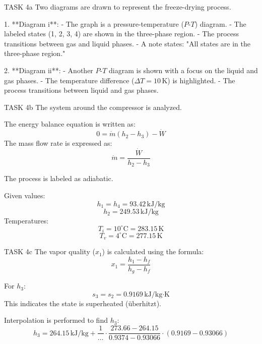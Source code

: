 TASK 4a  
Two diagrams are drawn to represent the freeze-drying process.  

1. **Diagram i**:  
   - The graph is a pressure-temperature (\(P\)-\(T\)) diagram.  
   - The labeled states (1, 2, 3, 4) are shown in the three-phase region.  
   - The process transitions between gas and liquid phases.  
   - A note states: "All states are in the three-phase region."  

2. **Diagram ii**:  
   - Another \(P\)-\(T\) diagram is shown with a focus on the liquid and gas phases.  
   - The temperature difference (\(\Delta T = 10 \, \text{K}\)) is highlighted.  
   - The process transitions between liquid and gas phases.  

TASK 4b  
The system around the compressor is analyzed.  

The energy balance equation is written as:  
\[
0 = \dot{m} (h_2 - h_3) - \dot{W}
\]  
The mass flow rate is expressed as:  
\[
\dot{m} = \frac{\dot{W}}{h_2 - h_3}
\]  

The process is labeled as adiabatic.  

Given values:  
\[
h_1 = h_4 = 93.42 \, \text{kJ/kg}
\]  
\[
h_2 = 249.53 \, \text{kJ/kg}
\]  
Temperatures:  
\[
T_i = 10^\circ\text{C} = 283.15 \, \text{K}
\]  
\[
T_v = 4^\circ\text{C} = 277.15 \, \text{K}
\]  

TASK 4c  
The vapor quality (\(x_1\)) is calculated using the formula:  
\[
x_1 = \frac{h_1 - h_f}{h_g - h_f}
\]  

For \(h_3\):  
\[
s_3 = s_2 = 0.9169 \, \text{kJ/kg·K}
\]  
This indicates the state is superheated (\( \text{überhitzt} \)).  

Interpolation is performed to find \(h_3\):  
\[
h_3 = 264.15 \, \text{kJ/kg} + \frac{1}{\dots} \cdot \frac{273.66 - 264.15}{0.9374 - 0.93066} \cdot (0.9169 - 0.93066)
\]  